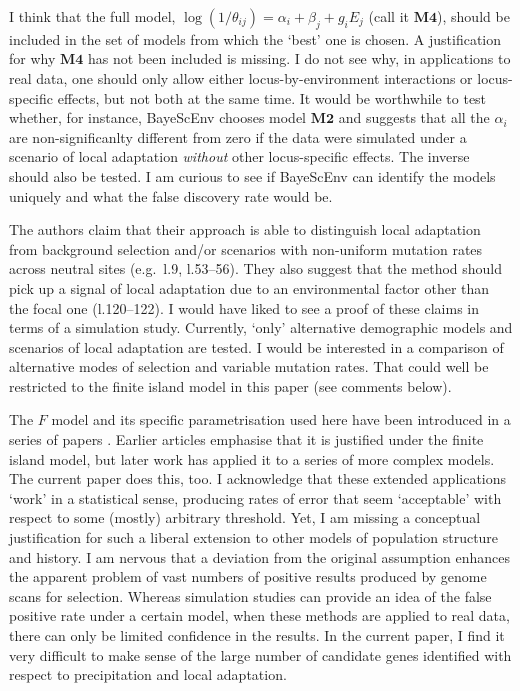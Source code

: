 \documentclass[11pt]{article}
\newenvironment{my_enumerate}
{\begin{enumerate}
  \setlength{\itemsep}{2pt}
  \setlength{\parskip}{0pt}
  \setlength{\parsep}{0pt}}
{\end{enumerate}}
\begin{document}
\begin{my_enumerate}
	\item I think that the full model, $\log{(1/\theta_{ij})} = \alpha_i + \beta_j + g_i E_j$ (call it $\mathbf{M4}$), should be included in the set of models from which the `best' one is chosen. A justification for why $\mathbf{M4}$ has not been included is missing. I do not see why, in applications to real data, one should only allow either locus-by-environment interactions or locus-specific effects, but not both at the same time. It would be worthwhile to test whether, for instance, BayeScEnv chooses model $\mathbf{M2}$ and suggests that all the $\alpha_i$ are non-significanlty different from zero if the data were simulated under a scenario of local adaptation \emph{without} other locus-specific effects. The inverse should also be tested. I am curious to see if BayeScEnv can identify the models uniquely and what the false discovery rate would be.
		
	\item The authors claim that their approach is able to distinguish local adaptation from background selection and/or scenarios with non-uniform mutation rates across neutral sites (e.g.\ l.9, l.53--56). They also suggest that the method should pick up a signal of local adaptation due to an environmental factor other than the focal one (l.120--122). I would have liked to see a proof of these claims in terms of a simulation study. Currently, `only' alternative demographic models and scenarios of local adaptation are tested. I would be interested in a comparison of alternative modes of selection and variable mutation rates. That could well be restricted to the finite island model in this paper (see comments below).
	
	\item The $F$ model and its specific parametrisation used here have been introduced in a series of papers \citep{Takahata:1983bs, Balding:1996fp, Balding:2003eu, Beaumont:2004kx, Foll:2008uq}. Earlier articles \cite[e.g.][]{Takahata:1983bs, Balding:1996fp} emphasise that it is justified under the finite island model, but later work has applied it to a series of more complex models. The current paper does this, too. I acknowledge that these extended applications `work' in a statistical sense, producing rates of error that seem `acceptable' with respect to some (mostly) arbitrary threshold. Yet, I am missing a conceptual justification for such a liberal extension to other models of population structure and history. I am nervous that a deviation from the original assumption enhances the apparent problem of vast numbers of positive results produced by genome scans for selection. Whereas simulation studies can provide an idea of the false positive rate under a certain model, when these methods are applied to real data, there can only be limited confidence in the results. In the current paper, I find it very difficult to make sense of the large number of candidate genes identified with respect to precipitation and local adaptation.
		

\end{my_enumerate}
\end{document}
